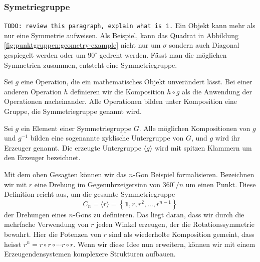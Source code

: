 \subsubsection{Symetriegruppe}
\texttt{TODO: review this paragraph, explain what is \(\mathds{1}\).}
Ein Objekt kann mehr als nur eine Symmetrie aufweisen.
Als Beispiel, kann das Quadrat in Abbildung \ref{fig:punktgruppen:geometry-example}
nicht nur um $\sigma$ sondern auch Diagonal gespiegelt werden oder um $90^\circ$ gedreht werden.
Fässt man die möglichen Symmetrien zusammen, entsteht eine Symmetriegruppe.

\begin{definition}[Symmetriegruppe]
	Sei \(g\) eine Operation, die ein mathematisches Objekt unverändert lässt.
	Bei einer anderen Operation \(h\) definieren wir die Komposition \(h\circ g\)
	als die Anwendung der Operationen nacheinander. Alle Operationen bilden unter
	Komposition eine Gruppe, die Symmetriegruppe genannt wird.
\end{definition} %

\begin{definition}
	Sei \(g\) ein Element einer Symmetriegruppe \(G\). Alle möglichen
	Kompositionen von \(g\) und \(g^{-1}\) bilden eine sogenannte zyklische
	Untergruppe von \(G\), und \(g\) wird ihr Erzeuger genannt. Die erzeugte
	Untergruppe \(\langle g \rangle\) wird mit spitzen Klammern um den Erzeuger
	bezeichnet.
\end{definition}

Mit dem oben Gesagten können wir das \(n\)-Gon Beispiel formalisieren.
Bezeichnen wir mit \(r\) eine Drehung im Gegenuhrzeigersinn von \(360^\circ/n\)
um einen Punkt.  Diese Definition reicht aus, um die gesamte Symmetriegruppe
\[
	C_n = \langle r \rangle
		= \left\{\mathds{1}, r, r^2, \ldots, r^{n-1}\right\}
\]
der Drehungen eines \(n\)-Gons zu definieren. Das liegt daran,
dass wir durch die mehrfache Verwendung von \(r\) jeden Winkel erzeugen, der
die Rotationssymmetrie bewahrt. Hier die Potenzen von \(r\) sind als
wiederholte Komposition gemeint, dass heisst \(r^n = r\circ r \circ \cdots
r\circ r\).  Wenn wir diese Idee nun erweitern, können wir mit einem
Erzeugendensystemen komplexere Strukturen aufbauen.


